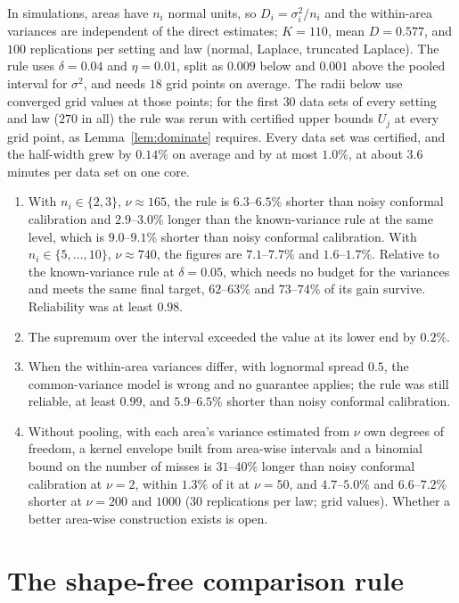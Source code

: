 \documentclass[11pt]{article}
\begin{document}
In simulations, areas have $n_i$ normal units, so $D_i = \sigma_i^2/n_i$ and the within-area variances are independent of the direct estimates; $K = 110$, mean $D = 0.577$, and $100$ replications per setting and law (normal, Laplace, truncated Laplace). The rule uses $\delta = 0.04$ and $\eta = 0.01$, split as $0.009$ below and $0.001$ above the pooled interval for $\sigma^2$, and needs $18$ grid points on average. The radii below use converged grid values at those points; for the first $30$ data sets of every setting and law ($270$ in all) the rule was rerun with certified upper bounds $U_j$ at every grid point, as Lemma~\ref{lem:dominate} requires. Every data set was certified, and the half-width grew by $0.14\%$ on average and by at most $1.0\%$, at about $3.6$ minutes per data set on one core.
\begin{enumerate}
\item With $n_i \in \{2, 3\}$, $\nu \approx 165$, the rule is $6.3$--$6.5\%$ shorter than noisy conformal calibration and $2.9$--$3.0\%$ longer than the known-variance rule at the same level, which is $9.0$--$9.1\%$ shorter than noisy conformal calibration. With $n_i \in \{5, \ldots, 10\}$, $\nu \approx 740$, the figures are $7.1$--$7.7\%$ and $1.6$--$1.7\%$. Relative to the known-variance rule at $\delta = 0.05$, which needs no budget for the variances and meets the same final target, $62$--$63\%$ and $73$--$74\%$ of its gain survive. Reliability was at least $0.98$.
\item The supremum over the interval exceeded the value at its lower end by $0.2\%$.
\item When the within-area variances differ, with lognormal spread $0.5$, the common-variance model is wrong and no guarantee applies; the rule was still reliable, at least $0.99$, and $5.9$--$6.5\%$ shorter than noisy conformal calibration.
\item Without pooling, with each area's variance estimated from $\nu$ own degrees of freedom, a kernel envelope built from area-wise intervals and a binomial bound on the number of misses is $31$--$40\%$ longer than noisy conformal calibration at $\nu = 2$, within $1.3\%$ of it at $\nu = 50$, and $4.7$--$5.0\%$ and $6.6$--$7.2\%$ shorter at $\nu = 200$ and $1000$ ($30$ replications per law; grid values). Whether a better area-wise construction exists is open.
\end{enumerate}

\section{The shape-free comparison rule}\label{sec:s-shapefree}
\end{document}

